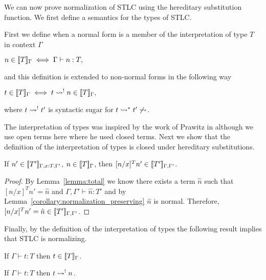 We can now prove normalization of STLC using the hereditary substitution
function.  We first define a semantics for the types of STLC.
\begin{definition}
  \label{def:interpretation_of_types_stlc}
  First we define when a normal form is a member of the interpretation of type $T$ in context $\Gamma$
  \begin{center}
    \begin{math}
    n \in [\negthinspace[T]\negthinspace]_\Gamma \iff \Gamma \vdash n:T,
  \end{math}
  \end{center}
  and this definition is extended to non-normal forms in the following way
  \begin{center}
    \begin{math}
    t \in [\negthinspace[T]\negthinspace]_\Gamma \iff t \rightsquigarrow^{!} n \in [\negthinspace[T]\negthinspace]_\Gamma,
  \end{math}
  \end{center}
  where $t \rightsquigarrow^{!} t'$ is syntactic sugar for $t \rightsquigarrow^* t' \not \rightsquigarrow$.
\end{definition}
\noindent 
The interpretation of types was inspired by the work of Prawitz in
\cite{Prawitz:2005} although we use open terms here where he used
closed terms.  Next we show that the definition of the interpretation
of types is closed under hereditary substitutions.
\begin{lemma}
  If $n' \in [\negthinspace[T']\negthinspace]_{\Gamma,x:T,\Gamma'}$, $n \in [\negthinspace[T]\negthinspace]_\Gamma$, then 
  $[n/x]^T n' \in [\negthinspace[T']\negthinspace]_{\Gamma,\Gamma'}$.
  
  \label{lemma:interpretation_of_types_closed_substitution_stlc}
\end{lemma}
\begin{proof}
  By Lemma~\ref{lemma:total} we know there exists a term $\hat{n}$ 
  such that $[n/x]^T n' = \hat{n}$ and $\Gamma,\Gamma' \vdash \hat{n}:T'$ and by 
  Lemma~\ref{corollary:normalization_preserving} $\hat{n}$ is normal.  Therefore,
  $[n/x]^T n' = \hat{n} \in [\negthinspace[T']\negthinspace]_{\Gamma,\Gamma'}$.
\end{proof}
\noindent
Finally, by the definition of the interpretation of types the
following result implies that STLC is normalizing.
\begin{thm}
  If $\Gamma \vdash t:T$ then $t \in [\negthinspace[T]\negthinspace]_\Gamma$.
  \label{thm:soundness_stlc}
\end{thm}

\begin{corollary}
  If $\Gamma \vdash t:T$ then $t \rightsquigarrow^{!} n$.
\end{corollary}

